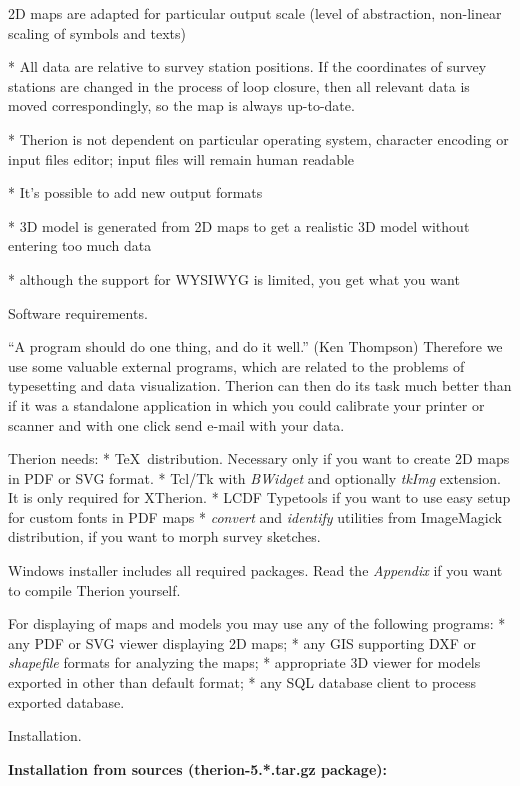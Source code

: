   2D maps are adapted for particular output scale (level of abstraction,
  non-linear scaling of symbols and texts)
  
* All data are relative to survey station positions. If the coordinates
  of survey stations are changed in the process of loop closure, then all relevant
  data is moved correspondingly, so the map is always up-to-date.

* Therion is not dependent on particular operating system, character encoding
  or input files editor; input files will remain human readable

* It's possible to add new output formats

* 3D model is generated from 2D maps to get a realistic 3D model 
  without entering too much data

* although the support for WYSIWYG is limited, you get what you want
\endlist

\subchapter Software requirements.

``A program should do one thing, and do it well.'' (Ken Thompson) 
Therefore we use some valuable external programs, which are related to the 
problems of typesetting and data visualization. Therion can then do its task 
much better than if it was a standalone application in which you could calibrate 
your printer or scanner and with one click send e-mail with your data.

Therion needs:
\list
* \TeX\ distribution.
  Necessary only if you want to create 2D maps in PDF or SVG format.
* Tcl/Tk with {\it BWidget} and optionally {\it tkImg} 
  extension. It is only required for XTherion.
* LCDF Typetools if you want to use easy setup for custom fonts in PDF maps
* {\it convert} and {\it identify} utilities from ImageMagick distribution, 
  if you want to morph survey sketches.
\endlist

Windows installer includes all required packages. 
Read the {\it Appendix} if you want to compile Therion yourself.

For displaying of maps and models you may use any of the following programs:
\list
* any PDF or SVG viewer displaying 2D maps;
* any GIS supporting DXF or {\it shapefile} formats for analyzing the maps;
* appropriate 3D viewer for models exported in other than default format;
* any SQL database client to process exported database.
\endlist


\subchapter Installation.

{\bf Installation from sources (therion-5.*.tar.gz package):}

